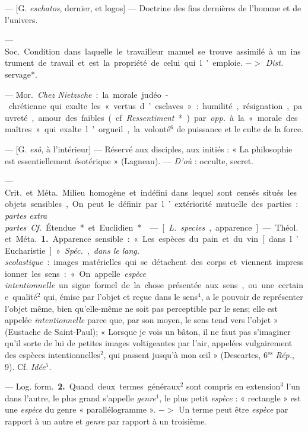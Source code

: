 \begin{itemize}[leftmargin=1cm, label=, itemsep=1pt]
 — [G. {\it eschatos}, dernier, et
logos] — Doctrine des fins dernières de l’homme et de l'univers.

 — \si{Soc.} Condition dans laquelle le travailleur manuel se
trouve assimilé à un instrument de
travail et est la propriété de celui
qui l'emploie. $->$ {\it Dist.} servage*.

 — \si{Mor.} {\it Chez Nietzsche} : la morale
judéo-chrétienne qui exalte les « vertus d’esclaves » : humilité,
résignation, pauvreté, amour des faibles (cf. {\it Ressentiment}*) par
{\it opp.} à la « morale des maîtres » qui exalte l’orgueil, la
volonté$^6$ de puissance et le culte de la force.

 — [G. {\it esô}, à l'intérieur] —
Réservé aux disciples, aux initiés :
« La philosophie est essentiellement
ésotérique » (Lagneau). — {\it D'où} :
occulte, secret.

 — \si{Crit.} et \si{Méta.} Milieu homogène et indéfini
dans lequel sont censés situés les objets sensibles, On
peut le définir par l’extériorité mutuelle des parties : {\it partes
extra partes}. {\it Cf.} Étendue* et Euclidien*.

 — [{\it L.} {\it species}, apparence] —
\si{Théol.} et \si{Méta.} {\bf 1.} Apparence sensible : « Les espèces
du pain et du vin [dans l’Eucharistie] ». {\it Spéc.},
{\it dans le lang. scolastique} : images
matérielles qui se détachent des
corps et viennent impressionner les
sens : « On appelle {\it espèce intentionnelle} un signe formel de la chose
présentée aux sens, ou une certaine
qualité$^2$ qui, émise par l'objet et
reçue dans le sens$^4$, a le pouvoir de
représenter l’objet même, bien
qu'elle-même ne soit pas perceptible par le sens; elle est appelée
{\it intentionnelle} parce que, par son
moyen, le sens tend vers l’objet »
(Eustache de Saint-Paul); « Lorsque
je vois un bâton, il ne faut pas
s’imaginer qu'il sorte de lui de petites images voltigeantes par l’air,
appelées vulgairement des espèces
intentionnelles$^2$, qui passent jusqu’à
mon œil » (Descartes, 6$^\text{es}$ {\it Rép.}, 9).
Cf. {\it Idée}$^5$.

— \si{Log. form.} {\bf 2.} Quand deux termes
généraux$^2$ sont compris en extension$^3$ l’un dans l’autre, le plus grand
s'appelle {\it genre}$^1$, le plus petit {\it espèce} :
« rectangle » est une {\it espèce} du genre
« parallélogramme ». $->$ Un terme
peut être {\it espèce} par rapport à un
autre et {\it genre} par rapport à un troisième.


\end{itemize}
